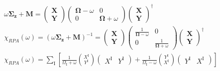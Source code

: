\begin{align}
\omega \mathbf{\Sigma_z} + \mathbf{M} = \begin{pmatrix}
\mathbf{X} \\
\mathbf{Y}
\end{pmatrix}
\begin{pmatrix}
\mathbf{\Omega } - \omega & 0 \\
0 & \mathbf{\Omega } + \omega
\end{pmatrix}
\begin{pmatrix}
\mathbf{X} \\
\mathbf{Y}
\end{pmatrix}^\dagger \\
\chi_{RPA}(\omega) = \left(\omega \mathbf{\Sigma_z} + \mathbf{M}\right)^{-1} = \begin{pmatrix}
\mathbf{X} \\
\mathbf{Y}
\end{pmatrix}
\begin{pmatrix}
\frac{1}{\mathbf{\Omega } - \omega} & 0 \\
0 & \frac{1}{\mathbf{\Omega } + \omega}
\end{pmatrix}
\begin{pmatrix}
\mathbf{X} \\
\mathbf{Y}
\end{pmatrix}^\dagger \\
\chi_{RPA}(\omega) = \sum_{\mathrm{I}}\left[\frac{1}{\Omega_{\mathrm{I}}+\omega}\binom{X^{\mathrm{I}}}{Y^{\mathrm{I}}}\left(\begin{array}{ll}
X^{\mathrm{I}} & Y^{\mathrm{I}}
\end{array}\right)+\frac{1}{\Omega_{\mathrm{I}}-\omega}\binom{Y^{\mathrm{I}}}{X^{\mathrm{I}}}\left(\begin{array}{ll}
Y^{\mathrm{I}} & X^{\mathrm{I}}
\end{array}\right)\right]
\end{align}

